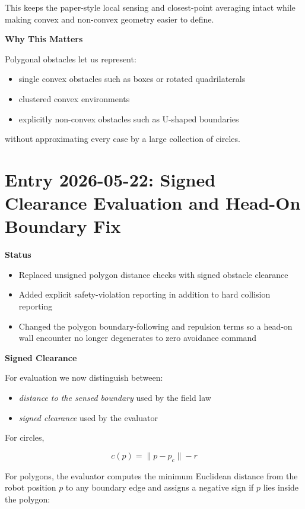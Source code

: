 \documentclass[11pt]{article}
\begin{document}
This keeps the paper-style local sensing and closest-point averaging intact
while making convex and non-convex geometry easier to define.

\textbf{Why This Matters}

Polygonal obstacles let us represent:

\begin{itemize}[leftmargin=*]
  \item single convex obstacles such as boxes or rotated quadrilaterals
  \item clustered convex environments
  \item explicitly non-convex obstacles such as U-shaped boundaries
\end{itemize}

without approximating every case by a large collection of circles.

\section*{Entry 2026-05-22: Signed Clearance Evaluation and Head-On Boundary Fix}

\textbf{Status}

\begin{itemize}[leftmargin=*]
  \item Replaced unsigned polygon distance checks with signed obstacle clearance
  \item Added explicit safety-violation reporting in addition to hard collision reporting
  \item Changed the polygon boundary-following and repulsion terms so a head-on wall encounter no longer degenerates to zero avoidance command
\end{itemize}

\textbf{Signed Clearance}

For evaluation we now distinguish between:

\begin{itemize}[leftmargin=*]
  \item \emph{distance to the sensed boundary} used by the field law
  \item \emph{signed clearance} used by the evaluator
\end{itemize}

For circles,

\begin{equation}
c(p) = \lVert p - p_c \rVert - r
\end{equation}

For polygons, the evaluator computes the minimum Euclidean distance from the
robot position $p$ to any boundary edge and assigns a negative sign if $p$ lies
inside the polygon:
\end{document}
